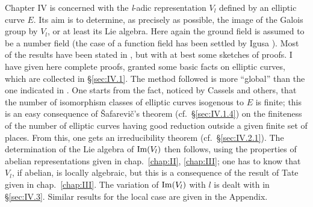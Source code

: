 Chapter IV is concerned with the \textit{l}-adic representation $V_l$
defined by an elliptic curve $E$. Its aim is to determine, as precisely as
possible, the image of the Galois group by $V_l$, or at least its Lie
algebra. Here again the ground field is assumed to be a number field (the
case of a function field has been settled by Igusa \cite{igusa}). Most of
the results have been stated in \cite{serre-lieg}, \cite{serre-resume} but
with at best some sketches of proofs. I have given here complete proofs,
granted some basic facts on elliptic curves, which are collected in
\S\ref{sec:IV.1}. The method followed is more ``global'' than the one
indicated in \cite{serre-lieg}. One starts from the fact, noticed by
Cassels and others, that the number of isomorphism classes of elliptic
curves isogenous to $E$ is finite; this is an easy consequence of
\v{S}afarevi\v{c}'s theorem (cf.~\S\ref{sec:IV.1.4}) on the finiteness
of the number of elliptic curves having good reduction outside a given
finite set of places. From this, one gets an irreducibility theorem
(cf.~\S\ref{sec:IV.2.1}). The determination of the Lie algebra of
$\mathrm{Im}(V_l)$ then follows, using the properties of abelian representations
given in chap.~\ref{chap:II}, \ref{chap:III}; one has to know that $V_l$,
if abelian, is locally algebraic, but this is a consequence of the result
of Tate given in chap.~\ref{chap:III}. The variation of $\mathrm{Im}(V_l)$ with
$l$ is dealt with in \S\ref{sec:IV.3}. Similar results for the local case
are given in the Appendix.
